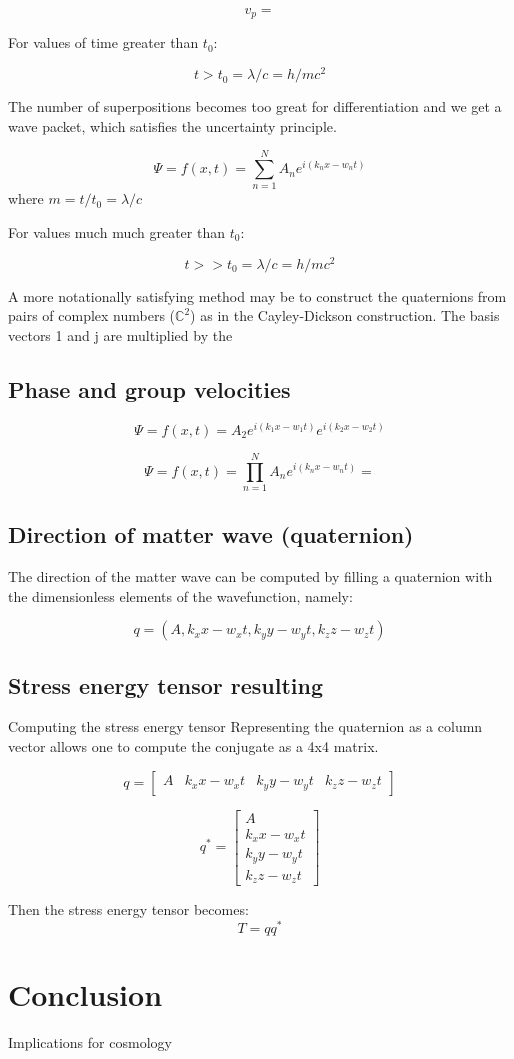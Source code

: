 \documentclass{article}
\begin{document}
$$v_p=$$

For values of time greater than $t_0$:

$$t>t_0=\lambda /c=h/mc^2$$

The number of superpositions becomes too great for differentiation and we get a wave packet, which satisfies the uncertainty principle.

$$\Psi=f(x,t)=\sum_{n=1}^N{A_n e^{i(k_n x-w_n t)}}$$ 
where $m=t/t_0=\lambda /c $

For values much much greater than $t_0$:

$$t>>t_0=\lambda /c=h/mc^2$$


A more notationally satisfying method may be to construct the quaternions from pairs of complex numbers ($\mathbb{C}^2$) as in the Cayley-Dickson construction. The basis vectors 1 and j are multiplied by the 

\subsection{Phase and group velocities}

$$\Psi=f(x,t)=A_2 e^{i(k_1 x-w_1 t)}e^{i(k_2 x-w_2 t)}$$

$$\Psi=f(x,t)=\prod_{n=1}^N{A_n e^{i(k_n x-w_n t)}}=$$

\subsection{Direction of matter wave (quaternion)}
The direction of the matter wave can be computed by filling a quaternion with the dimensionless elements of the wavefunction, namely:

$$q=(A, k_x x-w_x t, k_y y-w_y t, k_z z-w_z t)$$
\subsection{Stress energy tensor resulting}
Computing the stress energy tensor
Representing the quaternion as a column vector allows one to compute the conjugate as a 4x4 matrix.

$$q=
\left[
\begin{matrix}
A&k_x x-w_x t&k_y y-w_y t&k_z z-w_z t
\end{matrix}
\right]
$$

$$q^*=
\left[
\begin{matrix}
A\\k_x x-w_x t\\k_y y-w_y t\\k_z z-w_z t
\end{matrix}
\right]
$$

Then the stress energy tensor becomes:
$$T=qq^*$$
\section{Conclusion}
Implications for cosmology
\end{document}
